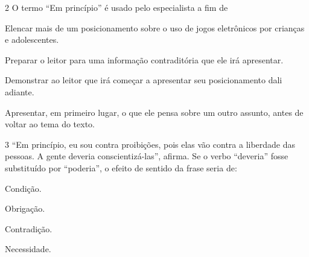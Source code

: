 \num{2} O termo ``Em princípio'' é usado pelo especialista a fim de

\begin{escolha}
\item Elencar mais de um posicionamento sobre o uso de jogos eletrônicos
por crianças e adolescentes.
\item Preparar o leitor para uma informação contraditória que ele irá
apresentar.
\item Demonstrar ao leitor que irá começar a apresentar seu posicionamento
dali adiante.
\item Apresentar, em primeiro lugar, o que ele pensa sobre um outro assunto,
antes de voltar ao tema do texto.
\end{escolha}



\num{3} ``Em princípio, eu sou contra proibições, pois elas vão contra a
liberdade das pessoas. A gente deveria conscientizá-las'', afirma. Se o
verbo ``deveria'' fosse substituído por ``poderia'', o efeito de sentido
da frase seria de:

\begin{escolha}
\item Condição.
\item Obrigação.
\item Contradição.
\item Necessidade.
\end{escolha}

